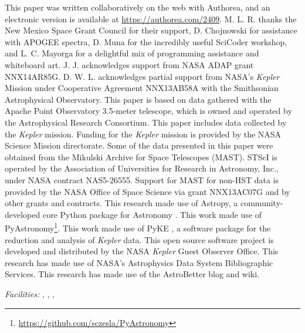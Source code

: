 \acknowledgments
This paper was written collaboratively on the web with Authorea, and an electronic version is available at \url{https://authorea.com/2409}. M. L. R. thanks the New Mexico Space Grant Council for their support, D. Chojnowski for assistance with APOGEE spectra, D. Muna for the incredibly useful SciCoder workshop, and L. C. Mayorga for a delightful mix of programming assistance and whiteboard art. J. J. acknowledges support from NASA ADAP grant NNX14AR85G. D. W. L. acknowledges partial support from NASA's \emph{Kepler} Mission under Cooperative Agreement NNX13AB58A with the Smithsonian Astrophysical Observatory. This paper is based on data gathered with the Apache Point Observatory 3.5-meter telescope, which is owned and operated by the Astrophysical Research Consortium. This paper includes data collected by the \emph{Kepler} mission. Funding for the \emph{Kepler} mission is provided by the NASA Science Mission directorate. Some of the data presented in this paper were obtained from the Mikulski Archive for Space Telescopes (MAST). STScI is operated by the Association of Universities for Research in Astronomy, Inc., under NASA contract NAS5-26555. Support for MAST for non-HST data is provided by the NASA Office of Space Science via grant NNX13AC07G and by other grants and contracts. This research made use of Astropy, a community-developed core Python package for Astronomy \citep{astropy}. This work made use of PyAstronomy\footnote{\url{https://github.com/sczesla/PyAstronomy}}. This work made use of PyKE \citep{pyke}, a software package for the reduction and analysis of \emph{Kepler} data. This open source software project is developed and distributed by the NASA \emph{Kepler} Guest Observer Office. This research has made use of NASA's Astrophysics Data System Bibliographic Services. This research has made use of the AstroBetter blog and wiki.

{\it Facilities:} , , , 

  
  
  
  